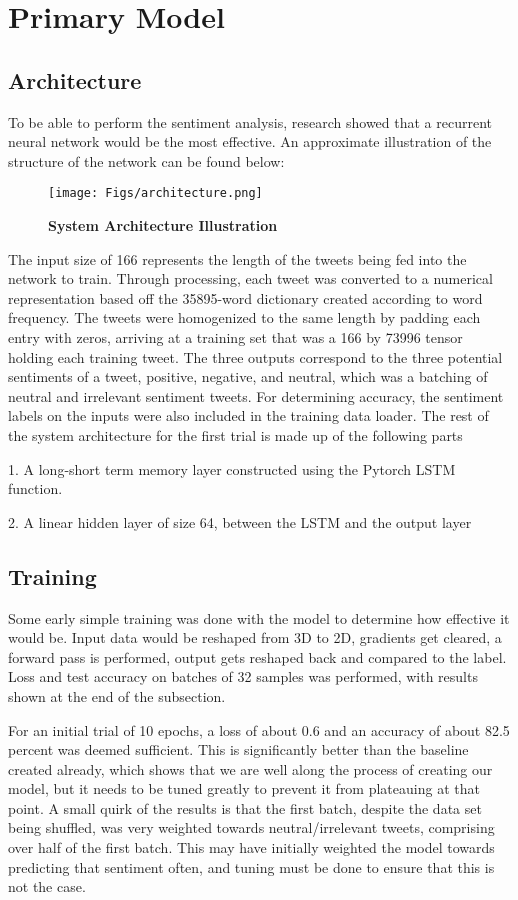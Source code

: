 \section{Primary Model}

\subsection{Architecture}
To be able to perform the sentiment analysis, research showed that a recurrent neural network would be the most effective. An approximate illustration of the structure of the network can be found below:

\begin{figure}[!ht]
    \centering
    \texttt{[image: Figs/architecture.png]}
    \caption{\textbf{System Architecture Illustration}}
\end{figure}

The input size of 166 represents the length of the tweets being fed into the network to train. Through processing, each tweet was converted to a numerical representation based off the 35895-word dictionary created according to word frequency. The tweets were homogenized to the same length by padding each entry with zeros, arriving at a training set that was a 166 by 73996 tensor holding each training tweet. The three outputs correspond to the three potential sentiments of a tweet, positive, negative, and neutral, which was a batching of neutral and irrelevant sentiment tweets. For determining accuracy, the sentiment labels on the inputs were also included in the training data loader. The rest of the system architecture for the first trial is made up of the following parts

1.	A long-short term memory layer constructed using the Pytorch LSTM function.

2.	A linear hidden layer of size 64, between the LSTM and the output layer

\subsection{Training}
Some early simple training was done with the model to determine how effective it would be. Input data would be reshaped from 3D to 2D, gradients get cleared, a forward pass is performed, output gets reshaped back and compared to the label. Loss and test accuracy on batches of 32 samples was performed, with results shown at the end of the subsection.

For an initial trial of 10 epochs, a loss of about 0.6 and an accuracy of about 82.5 percent was deemed sufficient. This is significantly better than the baseline created already, which shows that we are well along the process of creating our model, but it needs to be tuned greatly to prevent it from plateauing at that point. A small quirk of the results is that the first batch, despite the data set being shuffled, was very weighted towards neutral/irrelevant tweets, comprising over half of the first batch. This may have initially weighted the model towards predicting that sentiment often, and tuning must be done to ensure that this is not the case. 

